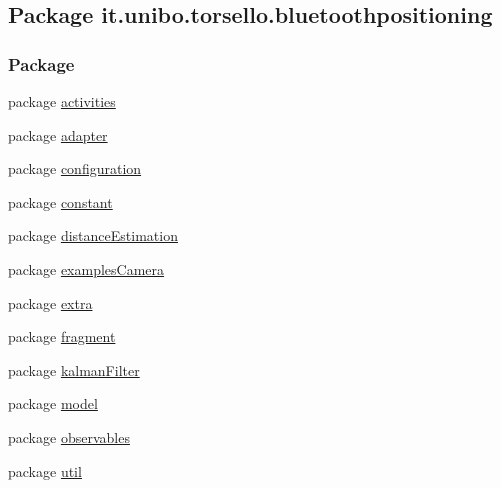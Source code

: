 \hypertarget{namespaceit_1_1unibo_1_1torsello_1_1bluetoothpositioning}{}\subsection{Package it.\+unibo.\+torsello.\+bluetoothpositioning}
\label{namespaceit_1_1unibo_1_1torsello_1_1bluetoothpositioning}
\subsubsection*{Package}
\begin{DoxyCompactItemize}
\item 
package \hyperlink{namespaceit_1_1unibo_1_1torsello_1_1bluetoothpositioning_1_1activities}{activities}
\item 
package \hyperlink{namespaceit_1_1unibo_1_1torsello_1_1bluetoothpositioning_1_1adapter}{adapter}
\item 
package \hyperlink{namespaceit_1_1unibo_1_1torsello_1_1bluetoothpositioning_1_1configuration}{configuration}
\item 
package \hyperlink{namespaceit_1_1unibo_1_1torsello_1_1bluetoothpositioning_1_1constant}{constant}
\item 
package \hyperlink{namespaceit_1_1unibo_1_1torsello_1_1bluetoothpositioning_1_1distanceEstimation}{distance\+Estimation}
\item 
package \hyperlink{namespaceit_1_1unibo_1_1torsello_1_1bluetoothpositioning_1_1examplesCamera}{examples\+Camera}
\item 
package \hyperlink{namespaceit_1_1unibo_1_1torsello_1_1bluetoothpositioning_1_1extra}{extra}
\item 
package \hyperlink{namespaceit_1_1unibo_1_1torsello_1_1bluetoothpositioning_1_1fragment}{fragment}
\item 
package \hyperlink{namespaceit_1_1unibo_1_1torsello_1_1bluetoothpositioning_1_1kalmanFilter}{kalman\+Filter}
\item 
package \hyperlink{namespaceit_1_1unibo_1_1torsello_1_1bluetoothpositioning_1_1model}{model}
\item 
package \hyperlink{namespaceit_1_1unibo_1_1torsello_1_1bluetoothpositioning_1_1observables}{observables}
\item 
package \hyperlink{namespaceit_1_1unibo_1_1torsello_1_1bluetoothpositioning_1_1util}{util}
\end{DoxyCompactItemize}
